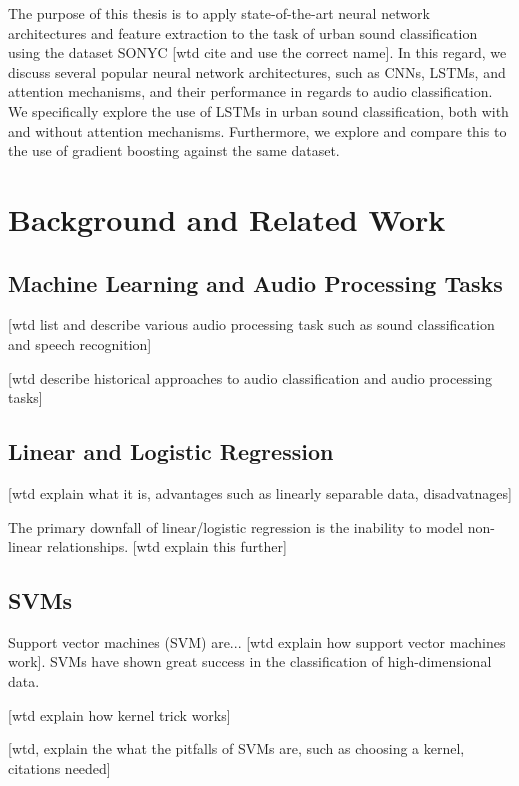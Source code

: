 \documentclass[a4paper,11pt,twoside]{scrbook}
\begin{document}
The purpose of this thesis is to apply state-of-the-art neural network architectures and feature extraction to the task of urban sound classification using the dataset SONYC [wtd cite and use the correct name].  In this regard, we discuss several popular neural network architectures, such as CNNs, LSTMs, and attention mechanisms, and their performance in regards to audio classification.  We specifically explore the use of LSTMs in urban sound classification, both with and without attention mechanisms.  Furthermore, we explore and compare this to the use of gradient boosting against the same dataset.

\chapter{Background and Related Work}
\label{Background and Related Work}

\section{Machine Learning and Audio Processing Tasks}

[wtd list and describe various audio processing task such as sound classification and speech recognition]

[wtd describe historical approaches to audio classification and audio processing tasks]

\section{Linear and Logistic Regression}

[wtd explain what it is, advantages such as linearly separable data, disadvatnages]

The primary downfall of linear/logistic regression is the inability to model non-linear relationships. [wtd explain this further]

\section{SVMs}

Support vector machines (SVM) are... [wtd explain how support vector machines work].  SVMs have shown great success in the classification of high-dimensional data.

[wtd explain how kernel trick works]

[wtd, explain the what the pitfalls of SVMs are, such as choosing a kernel, citations needed]
\end{document}
